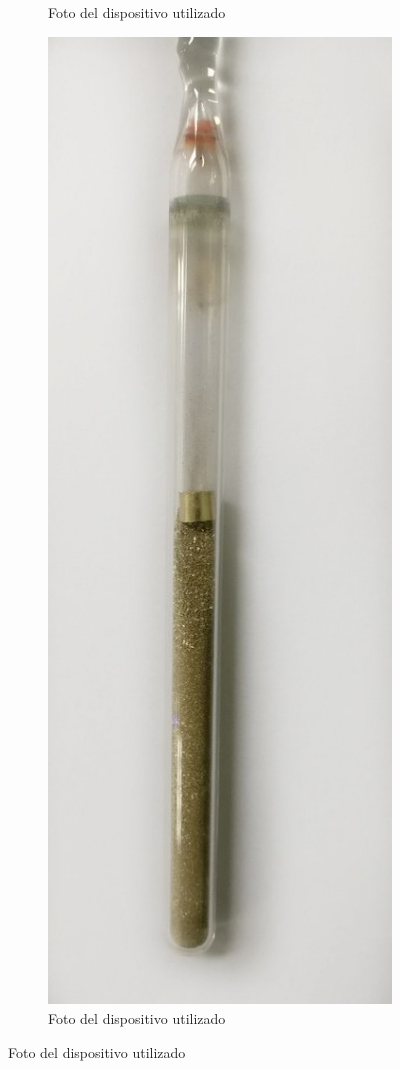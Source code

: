 \documentclass[a4paper,12pt,fleqn,twoside,openany]{book}
\begin{document}
\begin{figure}
\begin{subfigure}{0.3\textwidth}
        \caption{Foto del dispositivo utilizado}
        \label{fig:cuatropuntasyextensometro}
    \end{subfigure}
    \begin{subfigure}{0.1\textwidth}
        \includegraphics[width=\textwidth]{Img/Procedimiento/ClavoPolvo.jpg}
        \caption{Foto del dispositivo utilizado}
        \label{fig:cuatropuntasyextensometro}
    \end{subfigure}
  \end{figure}
\end{document}
